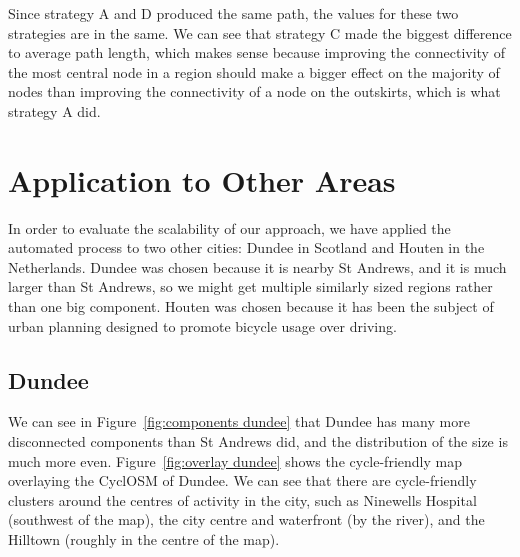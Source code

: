 \documentclass[12pt,a4paper]{report}
\begin{document}
Since strategy A and D produced the same path, the values for these two strategies are in the same. We can see that strategy C made the biggest difference to average path length, which makes sense because improving the connectivity of the most central node in a region should make a bigger effect on the majority of nodes than improving the connectivity of a node on the outskirts, which is what strategy A did.

\section{Application to Other Areas}
In order to evaluate the scalability of our approach, we have applied the automated process to two other cities: Dundee in Scotland and Houten in the Netherlands. Dundee was chosen because it is nearby St Andrews, and it is much larger than St Andrews, so we might get multiple similarly sized regions rather than one big component. Houten was chosen because it has been the subject of urban planning designed to promote bicycle usage over driving.

\subsection{Dundee}\label{sec:dundee}
We can see in Figure~\ref{fig:components dundee} that Dundee has many more disconnected components than St Andrews did, and the distribution of the size is much more even. Figure~\ref{fig:overlay dundee} shows the cycle-friendly map overlaying the CyclOSM of Dundee. We can see that there are cycle-friendly clusters around the centres of activity in the city, such as Ninewells Hospital (southwest of the map), the city centre and waterfront (by the river), and the Hilltown (roughly in the centre of the map).
\end{document}
